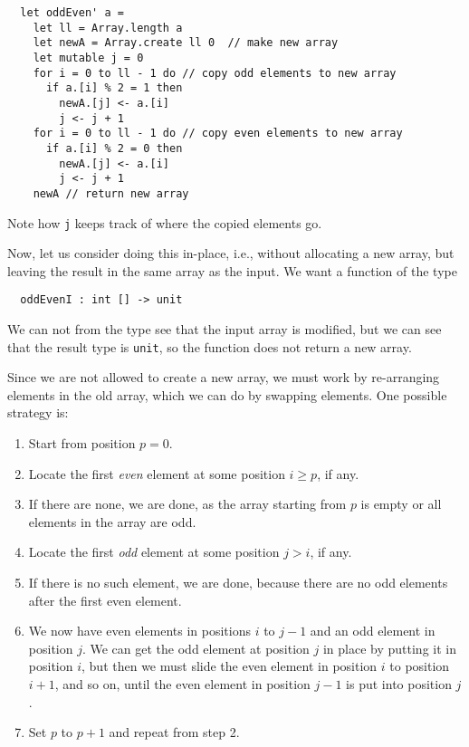 \documentclass[a4paper]{article}
\begin{document}
\begin{verbatim}
  let oddEven' a =
    let ll = Array.length a
    let newA = Array.create ll 0  // make new array
    let mutable j = 0
    for i = 0 to ll - 1 do // copy odd elements to new array
      if a.[i] % 2 = 1 then
        newA.[j] <- a.[i]
        j <- j + 1
    for i = 0 to ll - 1 do // copy even elements to new array
      if a.[i] % 2 = 0 then
        newA.[j] <- a.[i]
        j <- j + 1
    newA // return new array
\end{verbatim}

\noindent
Note how \texttt{j} keeps track of where the copied elements go.

Now, let us consider doing this in-place, i.e., without allocating a
new array, but leaving the result in the same array as the input.  
We want a function of the type

\begin{verbatim}
  oddEvenI : int [] -> unit
\end{verbatim}

\noindent
We can not from the type see that the input array is modified, but we
can see that the result type is \texttt{unit}, so the function does
not return a new array.

Since we are not allowed to create a new array, we must work by
re-arranging elements in the old array, which we can do by swapping
elements.  One possible strategy is:

\begin{enumerate}[1.]
\item Start from position $p=0$.
\item Locate the first \emph{even} element at some position $i\geq p$, if any.
\item If there are none, we are done, as the array starting from $p$
  is empty or all elements in the array are odd.
\item Locate the first \emph{odd} element at some position $j>i$, if
  any.
\item If there is no such element, we are done, because there are no
  odd elements after the first even element.
\item We now have even elements in positions $i$ to $j-1$ and an odd
  element in position $j$.  We can get the odd element at position $j$
  in place by putting it in position $i$, but then we must slide the
  even element in position $i$ to position $i+1$, and so on, until the
  even element in position $j-1$ is put into position $j$.
\item Set $p$ to $p+1$ and repeat from step 2.
\end{enumerate}
\end{document}
